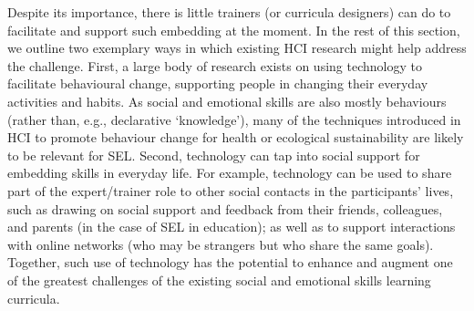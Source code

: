 \documentclass[prodmode,acmtochi]{acmsmall}
\newcommand{\todo}[1]{\textrm{\textrm{\textcolor{LightBlue}{[[#1]]} } } }
\newcommand{\GeraldineTODO}[1]{}
\begin{document}
Despite its importance, there is little trainers (or curricula designers) can do to facilitate and support such embedding at the moment. %
%
In the rest of this section, we outline two exemplary ways in which existing HCI research might help address the challenge. First, a large body of research exists on using technology to facilitate behavioural change, supporting people in changing their everyday activities and habits. As social and emotional skills are also mostly behaviours (rather than, e.g., declarative `knowledge'), many of the techniques introduced in HCI to promote behaviour change for health or ecological sustainability are likely to be relevant for SEL.\GeraldineTODO{G:  although the specifics of social skills again have the potential to further challenge existing HCI systems into novel directions ... why, how? be a little specific here? } Second,  technology can tap into social support for embedding skills in everyday life. For example, technology can be used to share part of the expert/trainer role to other social contacts in the participants' lives, such as drawing on social support and feedback from their friends, colleagues, and parents (in the case of SEL in education); as well as to support interactions with online networks (who may be strangers but who  share the same goals). 
%
Together, such use of technology has the potential to enhance and augment one of the greatest challenges of the existing social and emotional skills learning curricula. 



\end{document}
